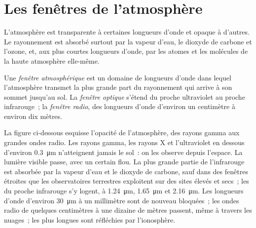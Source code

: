 \section{Les fenêtres de l'atmosphère}

L'atmosphère est transparente à certaines longueurs d'onde et opaque à
d'autres. Le rayonnement est absorbé surtout par la vapeur d'eau, le dioxyde de
carbone et l'ozone, et, aux plus courtes longueurs d'onde, par les atomes et les
molécules de la haute atmosphère elle-même.

\begin{definition}\label{def:b1:observing-the-sky:window}
Une \emph{fenêtre atmosphérique} est un domaine de longueurs d'onde dans lequel
l'atmosphère transmet la plus grande part du rayonnement qui arrive à son
sommet jusqu'au sol. La \emph{fenêtre optique} s'étend du proche ultraviolet au
proche infrarouge~; la \emph{fenêtre radio}, des longueurs d'onde d'environ un
centimètre à environ dix mètres.
\end{definition}

La figure ci-dessous esquisse l'opacité de l'atmosphère, des rayons gamma aux
grandes ondes radio. Les rayons gamma, les rayons X et l'ultraviolet en dessous
d'environ \qty{0.3}{\micro\metre} n'atteignent jamais le sol~: on les observe
depuis l'espace. La lumière visible passe, avec un certain flou. La plus grande
partie de l'infrarouge est absorbée par la vapeur d'eau et le dioxyde de
carbone, sauf dans des fenêtres étroites que les observatoires terrestres
exploitent sur des sites élevés et secs~; les  du proche
infrarouge s'y logent, à \qty{1.24}{\micro\metre}, \qty{1.65}{\micro\metre} et
\qty{2.16}{\micro\metre}. Les longueurs d'onde d'environ
\qty{30}{\micro\metre} à un millimètre sont de nouveau bloquées~; les ondes
radio de quelques centimètres à une dizaine de mètres passent, même à travers
les nuages~; les plus longues sont réfléchies par l'ionosphère.

